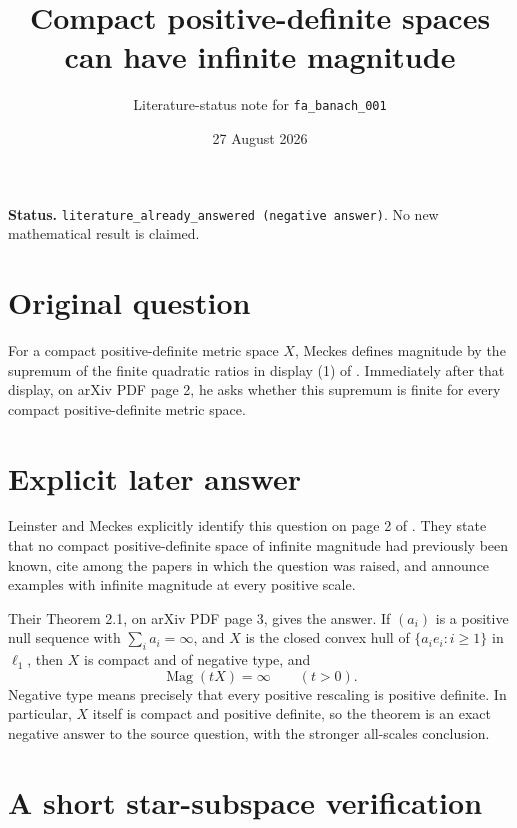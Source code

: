 \documentclass[11pt]{article}
\title{Compact positive-definite spaces can have infinite magnitude}
\author{Literature-status note for \texttt{fa\_banach\_001}}
\date{27 August 2026}
\newcommand{\Mag}{\operatorname{Mag}}
\newcommand{\ellone}{\ell_1}
\begin{document}
\maketitle

\noindent\textbf{Status.}
\texttt{literature\_already\_answered (negative answer)}.  No new
mathematical result is claimed.

\section*{Original question}

For a compact positive-definite metric space $X$, Meckes defines magnitude by
the supremum of the finite quadratic ratios in display (1) of
\cite{Meckes2019}.  Immediately after that display, on arXiv PDF page 2, he
asks whether this supremum is finite for every compact positive-definite
metric space.

\section*{Explicit later answer}

Leinster and Meckes explicitly identify this question on page 2 of
\cite{LeinsterMeckes2021}.  They state that no compact positive-definite
space of infinite magnitude had previously been known, cite
\cite{Meckes2019} among the papers in which the question was raised, and
announce examples with infinite magnitude at every positive scale.

Their Theorem 2.1, on arXiv PDF page 3, gives the answer.  If $(a_i)$ is a
positive null sequence with $\sum_i a_i=\infty$, and $X$ is the closed convex
hull of $\{a_i e_i:i\geq 1\}$ in $\ellone$, then $X$ is compact and of
negative type, and
\[
  \Mag(tX)=\infty \qquad (t>0).
\]
Negative type means precisely that every positive rescaling is positive
definite.  In particular, $X$ itself is compact and positive definite, so the
theorem is an exact negative answer to the source question, with the stronger
all-scales conclusion.

\section*{A short star-subspace verification}
\end{document}
